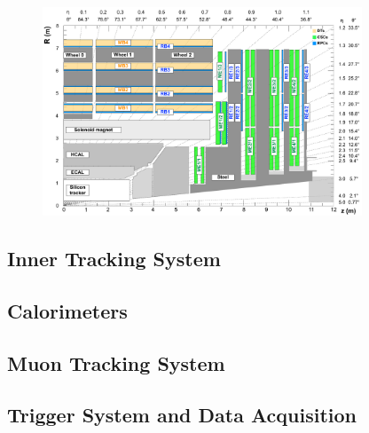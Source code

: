 \begin{figure}[htbp]
  \centering
  \includegraphics[width=0.85\textwidth]{fig/experiment/cms_crosssec.pdf}
  \caption{}
  \label{fig:CMSCrosssec}
\end{figure}

\subsection{Inner Tracking System}
\label{subsec:tracking}

\subsection{Calorimeters}
\label{subsec:calorimeter}

\subsection{Muon Tracking System}
\label{subsec:muonTrack}

\subsection{Trigger System and Data Acquisition}
\label{subsec:trigger}
